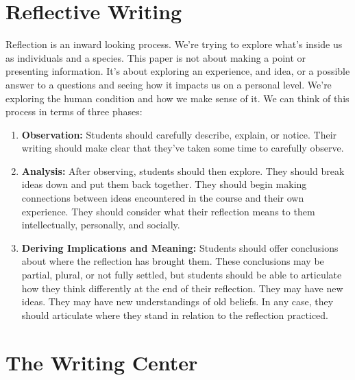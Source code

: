 \documentclass[]{tufte-handout}
\begin{document}
\section{Reflective Writing}

Reflection is an inward looking process. We're trying to explore what's inside us as individuals and a species. This paper is not about making a point or presenting information. It's about exploring an experience, and idea, or a possible answer to a questions and seeing how it impacts us on a personal level. We're exploring the human condition and how we make sense of it. We can think of this process in terms of three phases:
\begin{enumerate}
\item \textbf{Observation:} Students should carefully describe, explain, or notice. Their writing should make clear that they've taken some time to carefully observe. \newline
\item \textbf{Analysis:} After observing, students should then explore. They should break ideas down and put them back together. They should begin making connections between ideas encountered in the course and their own experience. They should consider what their reflection means to them intellectually, personally, and socially. \newline
\item \textbf{Deriving Implications and Meaning:} Students should offer conclusions about where the reflection has brought them. These conclusions may be partial, plural, or not fully settled, but students should be able to articulate how they think differently at the end of their reflection. They may have new ideas. They may have new understandings of old beliefs. In any case, they should articulate where they stand in relation to the reflection practiced. 
\end{enumerate}

\section{The Writing Center}
\end{document}
